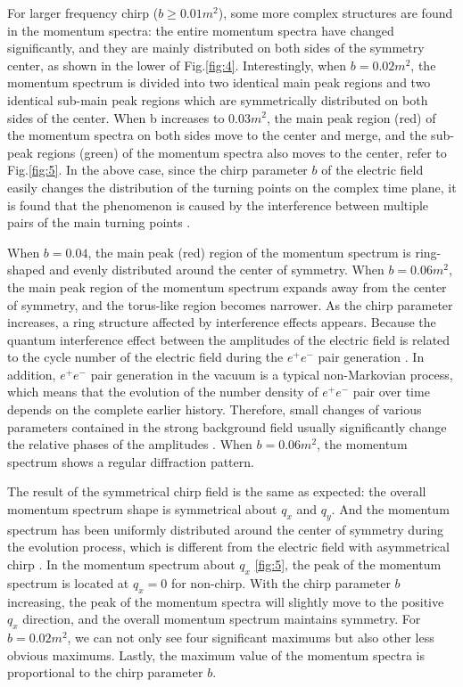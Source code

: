 \documentclass[aps,preprint,superscriptaddress]{revtex4}
\begin{document}
For larger frequency chirp ($b\geq 0.01$$m^2$), some more complex structures are found in the momentum spectra: the entire momentum spectra have changed significantly, and they are mainly distributed on both sides of the symmetry center, as shown in the lower of Fig.\ref{fig:4}. Interestingly, when $b=0.02$$m^2$, the momentum spectrum is divided into two identical main peak regions and two identical sub-main peak regions which are symmetrically distributed on both sides of the center. When b increases to $0.03$$m^2$, the main peak region (red) of the momentum spectra on both sides move to the center and merge, and the sub-peak regions (green) of the momentum spectra also moves to the center, refer to Fig.\ref{fig:5}. In the above case, since the chirp parameter $b$ of the electric field easily changes the distribution of the turning points on the complex time plane, it is found that the phenomenon is caused by the interference between multiple pairs of the main turning points \cite{Gong:2010pd}.


When $b=0.04$, the main peak (red) region of the momentum spectrum is ring-shaped and evenly distributed around the center of symmetry. When $b=0.06$$m^2$, the main peak region of the momentum spectrum expands away from the center of symmetry, and the torus-like region becomes narrower. As the chirp parameter increases, a ring structure affected by interference effects appears. Because the quantum interference effect between the amplitudes of the electric field is related to the cycle number of the electric field during the $e^{+}e^{-}$ pair generation \cite{Li2}. In addition, $e^{+}e^{-}$ pair generation in the vacuum is a typical non-Markovian process, which means that the evolution of the number density of $e^{+}e^{-}$ pair over time depends on the complete earlier history. Therefore, small changes of various parameters contained in the strong background field usually significantly change the relative phases of the amplitudes \cite{Abdukerim:2017cp}. When $b=0.06m^2$, the momentum spectrum shows a regular diffraction pattern.

The result of the symmetrical chirp field is the same as expected: the overall momentum spectrum shape is symmetrical about $q_x$ and $q_y$. And the momentum spectrum has been uniformly distributed around the center of symmetry during the evolution process, which is different from the electric field with asymmetrical chirp \cite{Olugh:2019pd}.
In the momentum spectrum about $q_x$ \ref{fig:5}, the peak of the momentum spectrum is located at $q_x=0$ for non-chirp. With the chirp parameter $b$ increasing, the peak of the momentum spectra will slightly move to the positive $q_x$ direction, and the overall momentum spectrum maintains symmetry. For $b=0.02m^2$, we can not only see four significant maximums but also other less obvious maximums. Lastly, the maximum value of the momentum spectra is proportional to the chirp parameter $b$.
\end{document}

